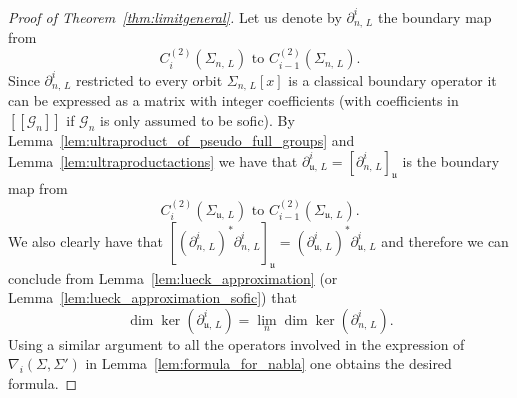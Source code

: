 \documentclass[AHL,Unicode,longabstracts,published]{cedram}
\newcommand{\cg}{\mathcal{G}}
\newcommand{\ul}{\mathfrak{u}}
\begin{document}
\begin{proof}[Proof of Theorem~\ref{thm:limitgeneral}]
Let us denote by $\partial_{n,\,L}^i$ the boundary map from
\[
C_{i}^{(2)}\left(\Sigma_{n,\,L}\right)\text{ to }C_{i-1}^{(2)}\left(\Sigma_{n,\,L}\right).
\]
Since $\partial_{n,\,L}^i$ restricted to every orbit $\Sigma_{n,\,L}[x]$ is a classical boundary operator it can be expressed as a matrix with integer coefficients (with coefficients in $[[\cg_n]]$ if $\cg_n$ is only assumed to be sofic). By Lemma~\ref{lem:ultraproduct_of_pseudo_full_groups} and Lemma~\ref{lem:ultraproductactions} we have that $\partial_{\ul,\,L}^i=[\partial_{n,\,L}^i]_\ul$ is the boundary map from
\[
C_{i}^{(2)}(\Sigma_{\ul,\,L})\text{ to }C_{i-1}^{(2)}(\Sigma_{\ul,\,L}).
\]
We also clearly have that $[(\partial_{n,\,L}^i)^*\partial_{n,\,L}^i]_\ul=(\partial_{\ul,\,L}^i)^*\partial_{\ul,\,L}^i$ and therefore we can conclude from Lemma~\ref{lem:lueck_approximation} (or Lemma~\ref{lem:lueck_approximation_sofic}) that
\[
\dim\ker\left(\partial_{\ul,\,L}^i\right) = \lim_n \dim\ker\left(\partial_{n,\,L}^i\right).
\]
Using a similar argument to all the operators involved in the expression of $ \nabla_i(\Sigma,\Sigma')$ in Lemma~\ref{lem:formula_for_nabla} one obtains the desired formula.
\end{proof}
\end{document}
